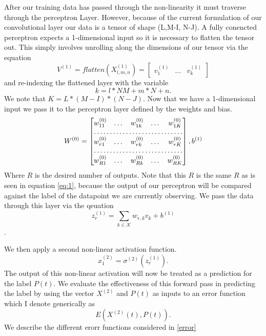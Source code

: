 \documentclass{article}
\begin{document}
After our training data has passed through the non-linearity it must traverse through the perceptron Layer.  However, because of the current formulation of our convolutional layer our data is a tensor of shape (L,M-I, N-J). A fully conencted perceptron expects a 1-dimensional input so it is necessary to flatten the tensor out.  This simply involves unrolling along the dimensions of our tensor via the equation
\begin{equation}
V^{(1)} =  flatten(X^{(1)}_{l,m,n}) = 
\begin{bmatrix}
v^{(1)}_{1} & \dots &v^{(1)}_{k} 
\end{bmatrix}
\end{equation} and re-indexing the flattened layer with the variable 
\begin{equation}
k = l*NM+m*N+n.
\end{equation}  We note that $K=L*(M-I)*(N-J)$.
Now that we have a 1-dimensional input we pass it to the perceptron layer defined by the weights and bias.
\begin{equation}
W^{(0)}=  \begin{bmatrix}
w^{(0)}_{11}  & \dots & w^{(0)}_{1k}& \dots& w^{(0)}_{1K} \\
\hdotsfor{5} \\
w^{(0)}_{r1}        & \dots& w^{(0)}_{rk} & \dots& w^{(0)}_{rK}\\
\hdotsfor{5}\\
w^{(0)}_{R1}        & \dots & w^{(0)}_{Rk}& \dots &w^{(0)}_{RK}
\end{bmatrix},
b^{(1)}
\end{equation}
Where $R$ is the desired number of outputs.  Note that this $R$ is the same $R$ as is seen in equation \ref{eq:1}, because the output of our perceptron will be compared against the label of the datapoint we are currently observing.  We pass the data through this layer via the qeuation
\begin{equation}
z^{(1)}_{r} = \sum_{k\in\mathcal{K}}w_{r,k}v_{k}+b^{(1)}	
\end{equation}.  

We then apply a second non-linear activation function.
\begin{equation}
x^{(2)}_{1} = \sigma^{(2)}(z^{(1)}_r).
\end{equation}
The output of this non-linear activation will now be treated as a prediction for the label $P(t)$.  We evaluate the effectiveness of this forward pass in predicting the label by using the vector $X^{(2)}$ and $P(t)$ as inputs to an error function which I denote generically as
\begin{equation}
E(X^{(2)}(t), P(t)).
\end{equation}  We describe the different erorr functions considered in \ref{error}
\end{document}
